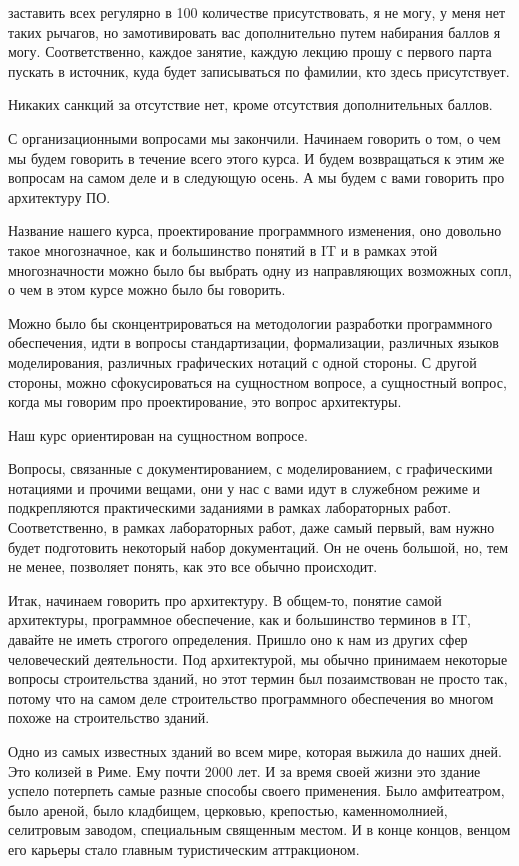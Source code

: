 заставить всех регулярно в 100 количестве присутствовать, я не могу, у меня нет таких рычагов, но замотивировать вас дополнительно путем набирания баллов я могу. Соответственно, каждое занятие, каждую лекцию прошу с первого парта пускать в источник, куда будет записываться по фамилии, кто здесь присутствует. 

Никаких санкций за отсутствие нет, кроме отсутствия дополнительных баллов.

С организационными вопросами мы закончили. Начинаем говорить о том, о чем мы будем говорить в течение всего этого курса. И будем возвращаться к этим же вопросам на самом деле и в следующую осень. А мы будем с вами говорить про архитектуру ПО.

Название нашего курса, проектирование программного изменения, оно довольно такое многозначное, как и большинство понятий в IT и в рамках этой многозначности можно было бы выбрать одну из направляющих возможных сопл, о чем в этом курсе можно было бы говорить.

Можно было бы сконцентрироваться на методологии разработки программного обеспечения, идти в вопросы стандартизации, формализации, различных языков моделирования, различных графических нотаций с одной стороны. С другой стороны, можно сфокусироваться на сущностном вопросе, а сущностный вопрос, когда мы говорим про проектирование, это вопрос архитектуры.

Наш курс ориентирован на сущностном вопросе. 

Вопросы, связанные с документированием, с моделированием, с графическими нотациями и прочими вещами, они у нас с вами идут в служебном режиме и подкрепляются практическими заданиями в рамках лабораторных работ. Соответственно, в рамках лабораторных работ, даже самый первый, вам нужно будет подготовить некоторый набор документаций. Он не очень большой, но, тем не менее, позволяет понять, как это все обычно происходит.


Итак, начинаем говорить про архитектуру. В общем-то, понятие самой архитектуры, программное обеспечение, как и большинство терминов в IT, давайте не иметь строгого определения. Пришло оно к нам из других сфер человеческий деятельности. Под архитектурой, мы обычно принимаем некоторые вопросы строительства зданий, но этот термин был позаимствован не просто так, потому что на самом деле строительство программного обеспечения во многом похоже на строительство зданий. 

Одно из самых известных зданий во всем мире, которая выжила до наших дней. Это колизей в Риме. Ему почти 2000 лет. И за время своей жизни это здание успело потерпеть самые разные способы своего применения. Было амфитеатром, было ареной, было кладбищем, церковью, крепостью, каменномолнией, селитровым заводом, специальным священным местом. И в конце концов, венцом его карьеры стало главным туристическим аттракционом.

